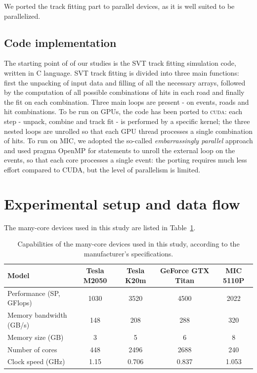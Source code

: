 \documentclass[letterpaper]{jpconf}
\begin{document}
We ported the track fitting part to parallel devices, as it is well suited to 
be parallelized. 

\subsection{Code implementation}
The starting point of of our studies is the SVT track fitting simulation code, 
written in C language. SVT track fitting is divided into three main functions: 
first the unpacking of input data and filling of all the necessary arrays, 
followed by the computation of all possible combinations of hits in each road 
and finally the fit on each combination. Three main loops are 
present - on events, roads and hit combinations. 
To be run on GPUs, the code has been ported to \textsc{cuda}: each step - 
unpack, combine and track fit - is performed by a specific kernel;
the three nested loops are unrolled so that each GPU thread processes a 
single combination of hits. 
To run on MIC, we adopted the so-called \textit{embarrassingly parallel} 
approach and used pragma OpenMP for statements to unroll the external loop 
on the events, so that each core processes a single event: the porting 
requires much less effort compared to CUDA, but the level of parallelism is 
limited.

\section{Experimental setup and data flow}
The many-core devices used in this study are listed in Table~\ref{tab_hwspecs}.

\begin{table}[!t]
  \centering
  \begin{tabular}{|l|c|c|c|c|}
    \hline
    Model & Tesla M2050 & Tesla K20m & GeForce GTX  Titan & MIC 5110P \\
    \hline
    \hline
    Performance (SP, GFlops) & 1030 & 3520 & 4500 & 2022 \\
    Memory bandwidth  (GB/s) & 148 & 208 & 288  & 320\\   
    Memory size (GB) & 3 & 5 & 6 & 8 \\
    Number of cores & 448 & 2496 & 2688 & 240 \\
    Clock speed (GHz) & 1.15 & 0.706 & 0.837 & 1.053 \\
    \hline
  \end{tabular}
  \caption{Capabilities of the many-core devices used in this study, according to the manufacturer's specifications.}
  \label{tab_hwspecs}
\end{table}
\end{document}
